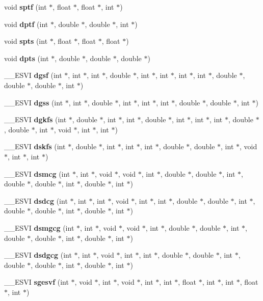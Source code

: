 \begin{CompactItemize}
\item 
void {\bf sptf} (int $\ast$, float $\ast$, float $\ast$, int $\ast$)
\item 
void {\bf dptf} (int $\ast$, double $\ast$, double $\ast$, int $\ast$)
\item 
void {\bf spts} (int $\ast$, float $\ast$, float $\ast$, float $\ast$)
\item 
void {\bf dpts} (int $\ast$, double $\ast$, double $\ast$, double $\ast$)
\item 
\_\-\_\-ESVI {\bf dgsf} (int $\ast$, int $\ast$, int $\ast$, double $\ast$, int $\ast$, int $\ast$, int $\ast$, int $\ast$, double $\ast$, double $\ast$, double $\ast$, int $\ast$)
\item 
\_\-\_\-ESVI {\bf dgss} (int $\ast$, int $\ast$, double $\ast$, int $\ast$, int $\ast$, int $\ast$, double $\ast$, double $\ast$, int $\ast$)
\item 
\_\-\_\-ESVI {\bf dgkfs} (int $\ast$, double $\ast$, int $\ast$, int $\ast$, double $\ast$, int $\ast$, int $\ast$, int $\ast$, double $\ast$, double $\ast$, int $\ast$, void $\ast$, int $\ast$, int $\ast$)
\item 
\_\-\_\-ESVI {\bf dskfs} (int $\ast$, double $\ast$, int $\ast$, int $\ast$, int $\ast$, double $\ast$, double $\ast$, int $\ast$, void $\ast$, int $\ast$, int $\ast$)
\item 
\_\-\_\-ESVI {\bf dsmcg} (int $\ast$, int $\ast$, void $\ast$, void $\ast$, int $\ast$, double $\ast$, double $\ast$, int $\ast$, double $\ast$, double $\ast$, int $\ast$, double $\ast$, int $\ast$)
\item 
\_\-\_\-ESVI {\bf dsdcg} (int $\ast$, int $\ast$, int $\ast$, void $\ast$, int $\ast$, int $\ast$, double $\ast$, double $\ast$, int $\ast$, double $\ast$, double $\ast$, int $\ast$, double $\ast$, int $\ast$)
\item 
\_\-\_\-ESVI {\bf dsmgcg} (int $\ast$, int $\ast$, void $\ast$, void $\ast$, int $\ast$, double $\ast$, double $\ast$, int $\ast$, double $\ast$, double $\ast$, int $\ast$, double $\ast$, int $\ast$)
\item 
\_\-\_\-ESVI {\bf dsdgcg} (int $\ast$, int $\ast$, void $\ast$, int $\ast$, int $\ast$, double $\ast$, double $\ast$, int $\ast$, double $\ast$, double $\ast$, int $\ast$, double $\ast$, int $\ast$)
\item 
\_\-\_\-ESVI {\bf sgesvf} (int $\ast$, void $\ast$, int $\ast$, void $\ast$, int $\ast$, int $\ast$, float $\ast$, int $\ast$, int $\ast$, float $\ast$, int $\ast$)
\item 

\end{CompactItemize}

